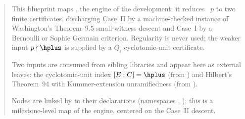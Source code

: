 \blueprintfrontmatter

\begin{abstract}
This blueprint maps , the engine of the development: it reduces
~$p$ to two finite certificates, discharging Case~II by
a machine-checked instance of Washington's Theorem~9.5 small-witness descent and
Case~I by a Bernoulli or Sophie Germain criterion. Regularity is never used; the
weaker input $p \nmid \hplus$ is supplied by a $Q_i$ cyclotomic-unit certificate.

Two inputs are consumed from sibling libraries and appear here as external leaves:
the cyclotomic-unit index $[E:C] = \hplus$ (from ) and
Hilbert's Theorem~94 with Kummer-extension unramifiedness (from ).

Nodes are linked by  to their declarations (namespaces
, ); this is a milestone-level map of
the engine, centered on the Case~II descent.
\end{abstract}






